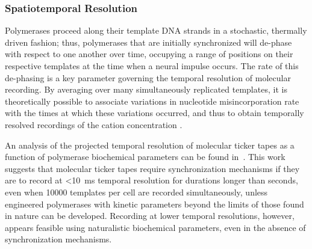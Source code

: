 \subsubsection{Spatiotemporal Resolution}

Polymerases proceed along their template DNA strands in a stochastic, thermally driven fashion; thus, polymerases that are initially synchronized will de-phase with respect to one another over time, occupying a range of positions on their respective templates at the time when a neural impulse occurs. The rate of this de-phasing is a key parameter governing the temporal resolution of molecular recording. By averaging over many simultaneously replicated templates, it is theoretically possible to associate variations in nucleotide misincorporation rate with the times at which these variations occurred, and thus to obtain temporally resolved recordings of the cation concentration \cite{glaser13}.

An analysis of the projected temporal resolution of molecular ticker tapes as a function of polymerase biochemical parameters can be found in~\cite{glaser13}.
This work suggests that molecular ticker tapes require synchronization mechanisms if they are to record at \SI{<10}{\ms} temporal resolution for durations longer than seconds, even when \num{10000} templates per cell are recorded simultaneously, unless engineered polymerases with kinetic parameters beyond the limits of those found in nature can be developed.
Recording at lower temporal resolutions, however, appears feasible using naturalistic biochemical parameters, even in the absence of synchronization mechanisms.

